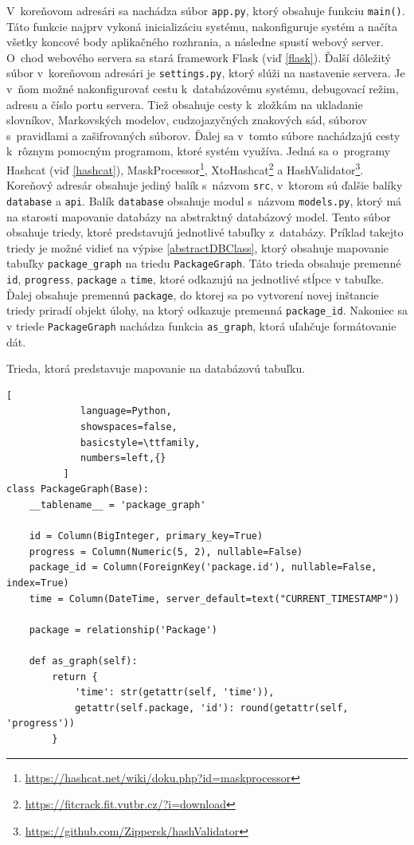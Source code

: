 \documentclass[zadani,slovak]{fitthesis}
\begin{document}
V~koreňovom adresári sa nachádza súbor \texttt{app.py}, ktorý obsahuje funkciu \texttt{main()}. Táto funkcie najprv vykoná inicializáciu systému, nakonfiguruje systém a načíta všetky koncové body aplikačného rozhrania, a následne spustí webový server. O~chod webového servera sa stará framework Flask (viď \ref{flask}). Ďalší dôležitý súbor v~koreňovom adresári je \texttt{settings.py}, ktorý slúži na nastavenie servera. Je v~ňom možné nakonfigurovať cestu k~databázovému systému, debugovací režim, adresu a číslo portu servera. Tiež obsahuje cesty k~zložkám na ukladanie slovníkov, Markovských modelov, cudzojazyčných znakových sád, súborov s~pravidlami a zašifrovaných súborov. Ďalej sa v~tomto súbore nachádzajú cesty k~rôznym pomocným programom, ktoré systém využíva. Jedná sa o~programy Hashcat (viď \ref{hashcat}), MaskProcessor\footnote{\url{https://hashcat.net/wiki/doku.php?id=maskprocessor}}, XtoHashcat\footnote{\url{https://fitcrack.fit.vutbr.cz/?i=download}} a HashValidator\footnote{\url{https://github.com/Zippersk/hashValidator}}. Koreňový adresár obsahuje jediný balík s~názvom \texttt{src}, v~ktorom sú ďalšie balíky \texttt{database} a \texttt{api}. Balík \texttt{database} obsahuje modul s~názvom \texttt{models.py}, ktorý má na starosti mapovanie databázy na abstraktný databázový model. Tento súbor obsahuje triedy, ktoré predstavujú jednotlivé tabuľky z~databázy. Príklad takejto triedy je možné vidieť na výpise \ref{abstractDBClass}, ktorý obsahuje mapovanie tabuľky \texttt{package\_graph} na triedu \texttt{PackageGraph}. Táto trieda obsahuje premenné \texttt{id}, \texttt{progress}, \texttt{package} a \texttt{time}, ktoré odkazujú na jednotlivé stĺpce v tabuľke. Ďalej obsahuje premennú \texttt{package}, do ktorej sa po vytvorení novej inštancie triedy priradí objekt úlohy, na ktorý odkazuje premenná \texttt{package\_id}. Nakoniec sa v triede \texttt{PackageGraph} nachádza funkcia \texttt{as\_graph}, ktorá uľahčuje formátovanie dát.
\begin{algorithm}
  \caption{Trieda, ktorá predstavuje mapovanie na databázovú tabuľku.}
  \label{abstractDBClass}
  \begin{lstlisting}[
             language=Python,
             showspaces=false,
             basicstyle=\ttfamily,
             numbers=left,{}
          ]
class PackageGraph(Base):
    __tablename__ = 'package_graph'

    id = Column(BigInteger, primary_key=True)
    progress = Column(Numeric(5, 2), nullable=False)
    package_id = Column(ForeignKey('package.id'), nullable=False, index=True)
    time = Column(DateTime, server_default=text("CURRENT_TIMESTAMP"))

    package = relationship('Package')

    def as_graph(self):
        return {
            'time': str(getattr(self, 'time')),
            getattr(self.package, 'id'): round(getattr(self, 'progress'))
        }
  \end{lstlisting}
\end{algorithm}
\end{document}
